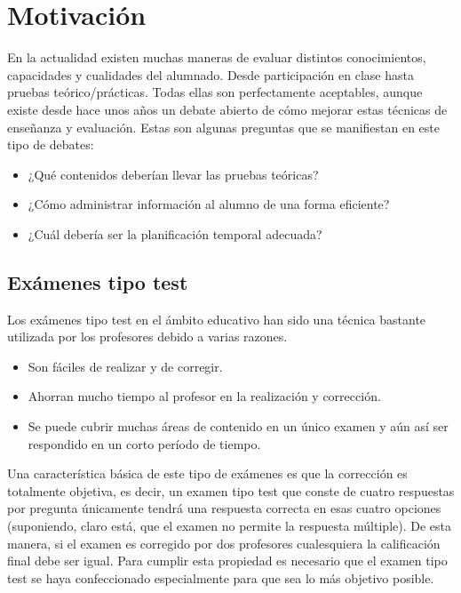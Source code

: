 \documentclass[a4paper, 12pt]{book}
\begin{document}
\section{Motivación}
\label{sec:Motivación}

En la actualidad existen muchas maneras de evaluar distintos conocimientos,
capacidades y cualidades del alumnado. Desde participación en clase hasta
pruebas teórico/prácticas. Todas ellas son perfectamente aceptables, aunque
existe desde hace unos años un debate abierto de cómo mejorar estas técnicas
de enseñanza y evaluación. Estas son algunas preguntas que se manifiestan
en este tipo de debates:

\begin{itemize}
  \item ¿Qué contenidos deberían llevar las pruebas teóricas?
  
  \item ¿Cómo administrar información al alumno de una forma eficiente?
  
  \item ¿Cuál debería ser la planificación temporal adecuada?
\end{itemize}

\subsection{Exámenes tipo test}
\label{subsec:examenes_tipo_test}

Los exámenes tipo test en el ámbito educativo han sido una técnica bastante
utilizada por los profesores debido a varias razones.

\begin{itemize}
  \item Son fáciles de realizar y de corregir.

  \item Ahorran mucho tiempo al profesor en la realización y corrección.
  
  \item Se puede cubrir muchas áreas de contenido en un único examen
  y aún así ser respondido en un corto período de tiempo.
\end{itemize}

Una característica básica de este tipo de exámenes es que la corrección
es totalmente objetiva, es decir, un examen tipo test que conste de cuatro respuestas
por pregunta únicamente tendrá una respuesta correcta en esas cuatro opciones 
(suponiendo, claro está, que el examen no permite la respuesta múltiple).
De esta manera, si el examen es corregido por dos profesores cualesquiera la
calificación final debe ser igual.
Para cumplir esta propiedad es necesario que el examen tipo test se haya
confeccionado especialmente para que sea lo más objetivo posible.
\end{document}
